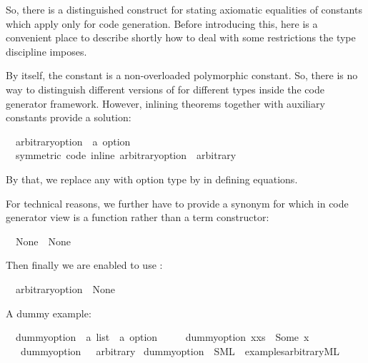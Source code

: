 \begin{isabellebody}
\begin{isamarkuptext}
  So, there is a distinguished construct for stating axiomatic
  equalities of constants which apply only for code generation.
  Before introducing this, here is a convenient place to describe
  shortly how to deal with some restrictions the type discipline
  imposes.

  By itself, the constant  is a non-overloaded
  polymorphic constant.  So, there is no way to distinguish
  different versions of  for different types
  inside the code generator framework.  However, inlining
  theorems together with auxiliary constants provide a solution:%
\end{isamarkuptext}%
\isamarkuptrue%
\isamarkupfalse%
\isanewline
\ \ arbitrary{\isacharunderscore}option\ {\isacharcolon}{\isacharcolon}\ {\isachardoublequoteopen}{\isacharprime}a\ option{\isachardoublequoteclose}\ \isanewline
\ \ {\isacharbrackleft}symmetric{\isacharcomma}\ code\ inline{\isacharbrackright}{\isacharcolon}\ {\isachardoublequoteopen}arbitrary{\isacharunderscore}option\ {\isacharequal}\ arbitrary{\isachardoublequoteclose}%
\begin{isamarkuptext}%
By that, we replace any  with option type
  by  in defining equations.

  For technical reasons, we further have to provide a
  synonym for  which in code generator view
  is a function rather than a term constructor:%
\end{isamarkuptext}%
\isamarkuptrue%
\isamarkupfalse%
\isanewline
\ \ {\isachardoublequoteopen}None{\isacharprime}\ {\isacharequal}\ None{\isachardoublequoteclose}%
\begin{isamarkuptext}%
Then finally we are enabled to use \isa{{\isasymCODEAXIOMS}}:%
\end{isamarkuptext}%
\isamarkuptrue%
\isamarkupfalse%
\isanewline
\ \ arbitrary{\isacharunderscore}option\ {\isasymequiv}\ None{\isacharprime}%
\begin{isamarkuptext}%
A dummy example:%
\end{isamarkuptext}%
\isamarkuptrue%
\isamarkupfalse%
\isanewline
\ \ dummy{\isacharunderscore}option\ {\isacharcolon}{\isacharcolon}\ {\isachardoublequoteopen}{\isacharprime}a\ list\ {\isasymRightarrow}\ {\isacharprime}a\ option{\isachardoublequoteclose}\ \isanewline
\ \ \ \ {\isachardoublequoteopen}dummy{\isacharunderscore}option\ {\isacharparenleft}x{\isacharhash}xs{\isacharparenright}\ {\isacharequal}\ Some\ x{\isachardoublequoteclose}\isanewline
\ \ {\isacharbar}\ {\isachardoublequoteopen}dummy{\isacharunderscore}option\ {\isacharbrackleft}{\isacharbrackright}\ {\isacharequal}\ arbitrary{\isachardoublequoteclose}\isanewline
\isanewline
{}\isamarkupfalse%
\ dummy{\isacharunderscore}option\ \ SML\ \ {\isachardoublequoteopen}examples{\isacharslash}arbitrary{\isachardot}ML{\isachardoublequoteclose}%
\begin{isamarkuptext}%


\end{isamarkuptext}
\end{isabellebody}
